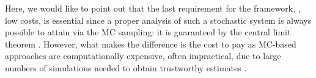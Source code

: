 Here, we would like to point out that the last requirement for the framework, \ie, low costs, is essential since a proper analysis of such a stochastic system is always possible to attain via the MC sampling: it is guaranteed by the central limit theorem \cite{durrett2010}. However, what makes the difference is the cost to pay as MC-based approaches are computationally expensive, often impractical, due to large numbers of simulations needed to obtain trustworthy estimates \cite{xiu2010, maitre2010, diaz-emparanza2002}.
